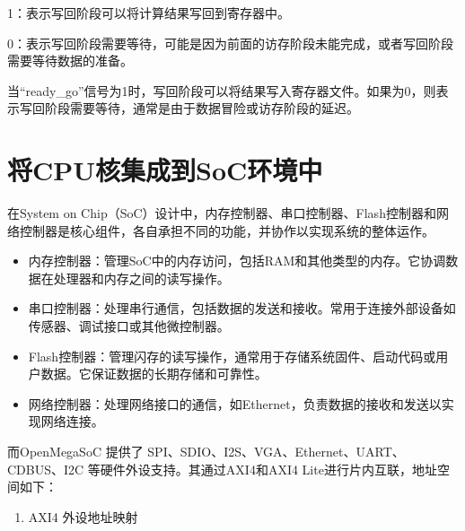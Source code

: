 1：表示写回阶段可以将计算结果写回到寄存器中。

0：表示写回阶段需要等待，可能是因为前面的访存阶段未能完成，或者写回阶段需要等待数据的准备。

当``ready\_go''信号为1时，写回阶段可以将结果写入寄存器文件。如果为0，则表示写回阶段需要等待，通常是由于数据冒险或访存阶段的延迟。

\section{将CPU核集成到SoC环境中}\label{sec:05-simple-cpu-012}

在System on Chip（SoC）设计中，内存控制器、串口控制器、Flash控制器和网络控制器是核心组件，各自承担不同的功能，并协作以实现系统的整体运作。

\begin{itemize}
\item
  内存控制器：管理SoC中的内存访问，包括RAM和其他类型的内存。它协调数据在处理器和内存之间的读写操作。
\item
  串口控制器：处理串行通信，包括数据的发送和接收。常用于连接外部设备如传感器、调试接口或其他微控制器。
\item
  Flash控制器：管理闪存的读写操作，通常用于存储系统固件、启动代码或用户数据。它保证数据的长期存储和可靠性。
\item
  网络控制器：处理网络接口的通信，如Ethernet，负责数据的接收和发送以实现网络连接。
\end{itemize}

而OpenMegaSoC 提供了 SPI、SDIO、I2S、VGA、Ethernet、UART、CDBUS、I2C 等硬件外设支持。其通过AXI4和AXI4 Lite进行片内互联，地址空间如下：

\begin{enumerate}
\def\labelenumi{\arabic{enumi}.}
\tightlist
\item
  AXI4 外设地址映射
\end{enumerate}

